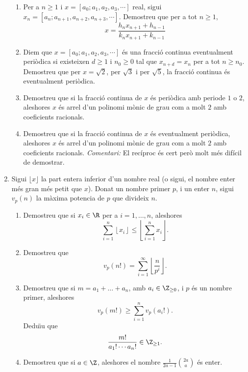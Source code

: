 \begin{enumerate}[leftmargin=*]
\begin{enumerate}
\item  Per a $n\ge 1$ i $x=[a_0;a_1,a_2,a_3,\cdots]$ real,
sigui $x_n=[a_n;a_{n+1},a_{n+2},a_{n+3},\cdots]$. Demostreu que per
a tot $n\ge 1$,
$$x=\frac {h_nx_{n+1}+h_{n-1}}{k_nx_{n+1}+k_{n-1}}$$

\item  Diem que $x=[a_0;a_1,a_2,a_3,\cdots]$ és una fracció
continua eventualment periòdica si existeixen $d\ge 1$ i $n_0\ge 0$
tal que $x_{n+d}=x_{n}$ per a tot $n\ge n_0$. Demostreu que per
$x=\sqrt{2}$, per $\sqrt{3}$ i per $\sqrt{5}$, la fracció continua
és eventualment periòdica.

\item  Demostreu que si la fracció continua de $x$ és periòdica
amb periode $1$ o $2$, aleshores $x$ és arrel d'un polinomi mònic de
grau com a molt $2$ amb coeficients racionals.

\item Demostreu que si la fracció continua de $x$ és
eventualment periòdica, aleshores $x$ és arrel d'un polinomi mònic
de grau com a molt $2$ amb coeficients racionals. \emph{Comentari:} El recíproc  és cert però molt més difícil de demostrar.

\end{enumerate}




\item Sigui $\lfloor x \rfloor$ la part entera inferior d'un
nombre real (o sigui, el nombre enter més gran més petit que $x$).
Donat un nombre primer $p$, i un enter $n$, sigui $v_p(n)$ la màxima
potencia de $p$ que divideix $n$.

\begin{enumerate}

\item  Demostreu que si $x_i\in \R$ per a $i=1,\dots, n$,
aleshores $$\sum_{i=1}^{n} \left\lfloor x_i\right\rfloor \le
\left\lfloor \sum_{i=1}^{n} x_i\right\rfloor.$$

\item  Demostreu que $$v_p(n!)=\sum_{i=1}^{\infty} \left\lfloor
\frac n{p^i}\right\rfloor.$$

\item  Demostreu que si $m=a_1+\dots+a_n$, amb $a_i\in \Z_{\ge
0}$, i $p$ és un nombre primer, aleshores
$$v_p(m!)\ge \sum_{i=1}^{n} v_p(a_i!).$$
Dedu\"{\i}u que $$\frac {m!}{a_1!\cdots a_n!}\in\Z_{\ge 1}.$$

\item  Demostreu que si $a\in \Z$, aleshores el nombre $\frac
1{2a-1} \binom{2a}{a}$ és enter.



\end{enumerate}
\end{enumerate}
